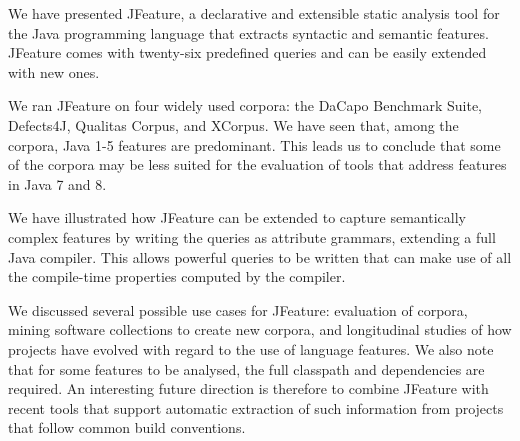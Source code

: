 We have presented JFeature, a declarative and extensible static analysis tool for the Java programming language that extracts syntactic and semantic features.
JFeature comes with twenty-six predefined queries and can be easily extended with new
ones.

We ran JFeature on four widely used corpora: the DaCapo Benchmark Suite, Defects4J, Qualitas Corpus, and XCorpus.
We have seen that, among  the corpora, Java 1-5 features are predominant. This leads us to conclude that some of the corpora may be less suited for the evaluation of tools that address features in Java 7 and 8.

We have illustrated how JFeature can be extended to capture semantically complex features by writing the queries as attribute grammars, extending a full Java compiler. This allows powerful queries to be written that can make use of all the compile-time properties computed by the compiler.

We discussed several possible use cases for JFeature: evaluation of corpora, mining software collections to create new corpora, and longitudinal studies of how projects have evolved with regard to the use of language features.
We also note that for some features to be analysed, the full classpath and dependencies are required. An interesting future direction is therefore to combine JFeature with recent tools that support automatic extraction of such information from projects that follow common build conventions.